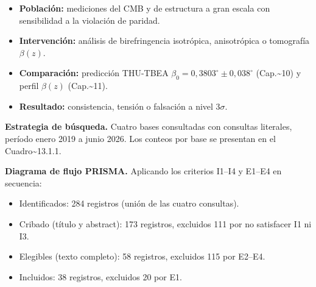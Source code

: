 ﻿\documentclass[11pt,letterpaper]{article}
\begin{document}
\begin{itemize}[leftmargin=*]
\item \textbf{Población:} mediciones del CMB y de estructura a gran escala con sensibilidad a la violación de paridad.
\item \textbf{Intervención:} análisis de birefringencia isotrópica, anisotrópica o tomografía $\beta(z)$.
\item \textbf{Comparación:} predicción THU-TBEA $\beta_0 = 0{,}3803^\circ \pm 0{,}038^\circ$ (Cap.\textasciitilde{}10) y perfil $\beta(z)$ (Cap.\textasciitilde{}11).
\item \textbf{Resultado:} consistencia, tensión o falsación a nivel $3\sigma$.
\end{itemize}

\textbf{Estrategia de búsqueda.} Cuatro bases consultadas con consultas literales, período enero 2019 a junio 2026. Los conteos por base se presentan en el Cuadro\textasciitilde{}13.1.1.

\begin{table}[htbp]
  \centering
  \small
  \caption{Conteo de registros identificados por base de datos.}
  \label{tab:prisma-bases}
\end{table}

\textbf{Diagrama de flujo PRISMA.} Aplicando los criterios I1--I4 y E1--E4 en secuencia:

\begin{itemize}[leftmargin=*]
\item Identificados: 284 registros (unión de las cuatro consultas).
\item Cribado (título y abstract): 173 registros, excluidos 111 por no satisfacer I1 ni I3.
\item Elegibles (texto completo): 58 registros, excluidos 115 por E2--E4.
\item Incluidos: 38 registros, excluidos 20 por E1.
\end{itemize}
\end{document}
